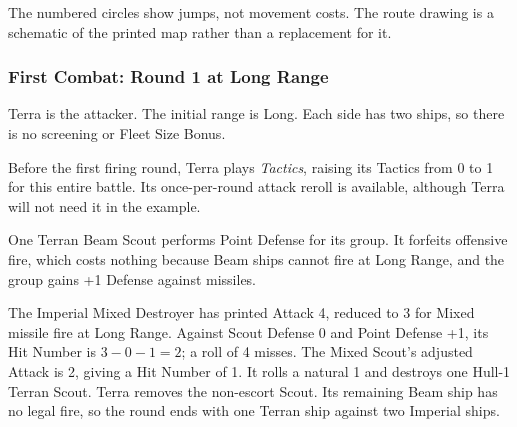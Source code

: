 \begin{center}
\end{center}

The numbered circles show jumps, not movement costs. The route drawing is a
schematic of the printed map rather than a replacement for it.

\subsubsection{First Combat: Round 1 at Long Range}

Terra is the attacker. The initial range is Long. Each side has two ships, so
there is no screening or Fleet Size Bonus.

Before the first firing round, Terra plays \textit{Tactics}, raising its
Tactics from 0 to 1 for this entire battle. Its once-per-round attack reroll is
available, although Terra will not need it in the example.

One Terran Beam Scout performs Point Defense for its group. It forfeits
offensive fire, which costs nothing because Beam ships cannot fire at Long
Range, and the group gains +1 Defense against missiles.

The Imperial Mixed Destroyer has printed Attack 4, reduced to 3 for Mixed
missile fire at Long Range. Against Scout Defense 0 and Point Defense +1, its
Hit Number is $3-0-1=2$; a roll of 4 misses. The Mixed Scout's adjusted Attack
is 2, giving a Hit Number of 1. It rolls a natural 1 and destroys one Hull-1
Terran Scout. Terra removes the non-escort Scout. Its remaining Beam ship has
no legal fire, so the round ends with one Terran ship against two Imperial
ships.

